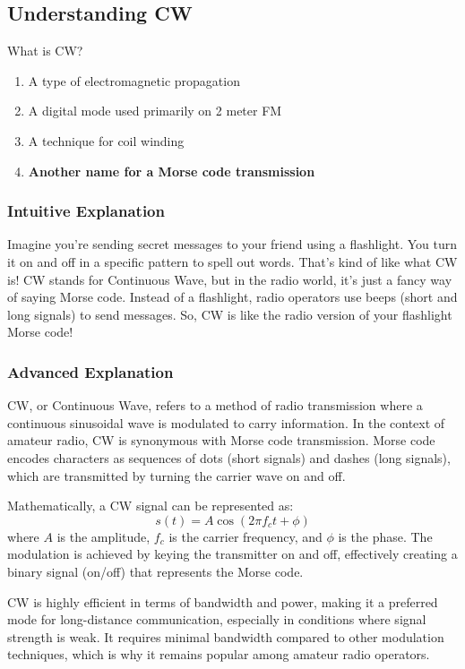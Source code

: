 \subsection{Understanding CW}
\label{T8D09}

\begin{tcolorbox}[colback=gray!10!white,colframe=black!75!black,title=T8D09]
What is CW?  
\begin{enumerate}[label=\Alph*)]
    \item A type of electromagnetic propagation
    \item A digital mode used primarily on 2 meter FM
    \item A technique for coil winding
    \item \textbf{Another name for a Morse code transmission}
\end{enumerate}
\end{tcolorbox}

\subsubsection{Intuitive Explanation}
Imagine you’re sending secret messages to your friend using a flashlight. You turn it on and off in a specific pattern to spell out words. That’s kind of like what CW is! CW stands for Continuous Wave, but in the radio world, it’s just a fancy way of saying Morse code. Instead of a flashlight, radio operators use beeps (short and long signals) to send messages. So, CW is like the radio version of your flashlight Morse code!

\subsubsection{Advanced Explanation}
CW, or Continuous Wave, refers to a method of radio transmission where a continuous sinusoidal wave is modulated to carry information. In the context of amateur radio, CW is synonymous with Morse code transmission. Morse code encodes characters as sequences of dots (short signals) and dashes (long signals), which are transmitted by turning the carrier wave on and off. 

Mathematically, a CW signal can be represented as:
\[
s(t) = A \cos(2\pi f_c t + \phi)
\]
where \( A \) is the amplitude, \( f_c \) is the carrier frequency, and \( \phi \) is the phase. The modulation is achieved by keying the transmitter on and off, effectively creating a binary signal (on/off) that represents the Morse code.

CW is highly efficient in terms of bandwidth and power, making it a preferred mode for long-distance communication, especially in conditions where signal strength is weak. It requires minimal bandwidth compared to other modulation techniques, which is why it remains popular among amateur radio operators.

